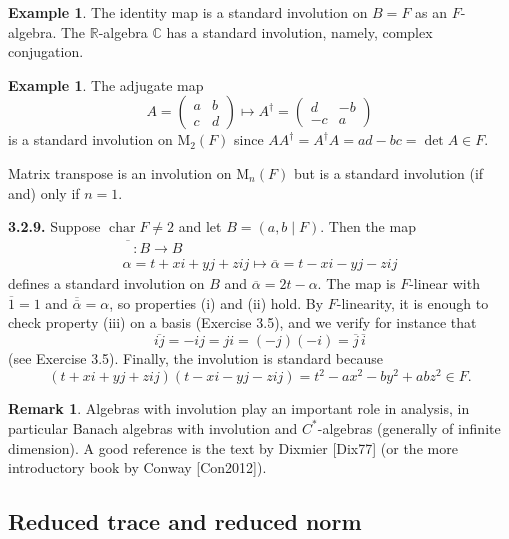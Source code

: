 \documentclass{article}
\theoremstyle{definition}
\newtheorem{example}[theorem]{Example}
\newtheorem{remark}[theorem]{Remark}
\begin{document}
\begin{example}
The identity map is a standard involution on $B = F$ as an $F$-algebra. The $\mathbb{R}$-algebra $\mathbb{C}$ has a standard involution, namely, complex conjugation.
\end{example}

\begin{example}
The adjugate map
$$A = \begin{pmatrix} a & b \\ c & d \end{pmatrix} \mapsto A^{\dagger} = \begin{pmatrix} d & -b \\ -c & a \end{pmatrix}$$
is a standard involution on $\mathrm{M}_2(F)$ since $AA^{\dagger} = A^{\dagger}A = ad - bc = \det A \in F$.

Matrix transpose is an involution on $\mathrm{M}_n(F)$ but is a standard involution (if and) only if $n = 1$.
\end{example}

\textbf{3.2.9.} Suppose $\operatorname{char} F \neq 2$ and let $B = (a, b \mid F)$. Then the map
$$\begin{array}{c} \overline{\phantom{B}}: B \to B \\ \alpha = t + xi + yj + zij \mapsto \overline{\alpha} = t - xi - yj - zij \end{array}$$
defines a standard involution on $B$ and $\overline{\alpha} = 2t - \alpha$. The map is $F$-linear with $\overline{1} = 1$ and $\overline{\overline{\alpha}} = \alpha$, so properties (i) and (ii) hold. By $F$-linearity, it is enough to check property (iii) on a basis (Exercise 3.5), and we verify for instance that
$$\overline{ij} = -ij = ji = (-j)(-i) = \overline{j}\,\overline{i}$$
(see Exercise 3.5). Finally, the involution is standard because
\begin{equation}
(t + xi + yj + zij)(t - xi - yj - zij) = t^2 - ax^2 - by^2 + abz^2 \in F. \tag{3.2.10}
\end{equation}

\begin{remark}
Algebras with involution play an important role in analysis, in particular Banach algebras with involution and $C^*$-algebras (generally of infinite dimension). A good reference is the text by Dixmier [Dix77] (or the more introductory book by Conway [Con2012]).
\end{remark}

\subsection{Reduced trace and reduced norm}
\end{document}
